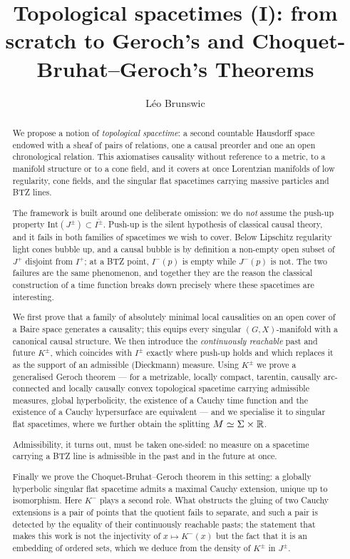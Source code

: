 \documentclass[a4paper,twoside]{article}
\title{Topological spacetimes (I): from scratch to Geroch's and Choquet-Bruhat--Geroch's Theorems}
\author{Léo Brunswic}
\begin{document}
\maketitle

\begin{abstract}
We propose a notion of \emph{topological spacetime}: a second countable Hausdorff space endowed
with a sheaf of pairs of relations, one a causal preorder and one an open chronological relation.
This axiomatises causality without reference to a metric, to a manifold structure or to a cone
field, and it covers at once Lorentzian manifolds of low regularity, cone fields, and the singular
flat spacetimes carrying massive particles and BTZ lines.

The framework is built around one deliberate omission: we do \emph{not} assume the push-up property
$\mathrm{Int}(J^\pm)\subset \overline{I^\pm}$. Push-up is the silent hypothesis of classical causal
theory, and it fails in both families of spacetimes we wish to cover. Below Lipschitz regularity
light cones bubble up, and a causal bubble is by definition a non-empty open subset of $J^+$
disjoint from $I^+$; at a BTZ point, $I^-(p)$ is empty while $J^-(p)$ is not. The two failures are
the same phenomenon, and together they are the reason the classical construction of a time function
breaks down precisely where these spacetimes are interesting.

We first prove that a family of absolutely minimal local causalities on an open cover of a Baire
space generates a causality; this equips every singular $(G,X)$-manifold with a canonical causal
structure. We then introduce the \emph{continuously reachable} past and future $K^\pm$, which
coincides with $I^\pm$ exactly where push-up holds and which replaces it as the support of an
admissible (Dieckmann) measure. Using $K^\pm$ we prove a generalised Geroch theorem --- for a
metrizable, locally compact, tarentin, causally arc-connected and locally causally convex
topological spacetime carrying admissible measures, global hyperbolicity, the existence of a Cauchy
time function and the existence of a Cauchy hypersurface are equivalent --- and we specialise it to
singular flat spacetimes, where we further obtain the splitting $M\simeq \Sigma\times \mathbb R$.

Admissibility, it turns out, must be taken one-sided: no measure on a spacetime carrying a BTZ line
is admissible in the past and in the future at once.

Finally we prove the Choquet-Bruhat--Geroch theorem in this setting: a globally hyperbolic singular
flat spacetime admits a maximal Cauchy extension, unique up to isomorphism. Here $K^-$ plays a second
role. What obstructs the gluing of two Cauchy extensions is a pair of points that the quotient fails
to separate, and such a pair is detected by the equality of their continuously reachable pasts; the
statement that makes this work is not the injectivity of $x\mapsto K^-(x)$ but the fact that it is an
embedding of ordered sets, which we deduce from the density of $K^\pm$ in $J^\pm$.
\end{abstract}
\end{document}
